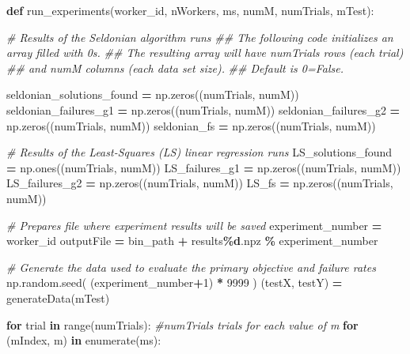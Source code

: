 \documentclass[12pt, twoside]{amherstthesis}
\newenvironment{Shaded}{\begin{snugshade}}{\end{snugshade}}
\newcommand{\BuiltInTok}[1]{#1}
\newcommand{\CommentTok}[1]{\textcolor[rgb]{0.56,0.35,0.01}{\textit{#1}}}
\newcommand{\ControlFlowTok}[1]{\textcolor[rgb]{0.13,0.29,0.53}{\textbf{#1}}}
\newcommand{\DecValTok}[1]{\textcolor[rgb]{0.00,0.00,0.81}{#1}}
\newcommand{\KeywordTok}[1]{\textcolor[rgb]{0.13,0.29,0.53}{\textbf{#1}}}
\newcommand{\NormalTok}[1]{#1}
\newcommand{\OperatorTok}[1]{\textcolor[rgb]{0.81,0.36,0.00}{\textbf{#1}}}
\newcommand{\SpecialCharTok}[1]{\textcolor[rgb]{0.81,0.36,0.00}{\textbf{#1}}}
\newcommand{\StringTok}[1]{\textcolor[rgb]{0.31,0.60,0.02}{#1}}
\begin{document}
\begin{Shaded}
\begin{Highlighting}[]
\KeywordTok{def}\NormalTok{ run\_experiments(worker\_id, nWorkers, ms, numM, numTrials, mTest):}
    
    \CommentTok{\# Results of the Seldonian algorithm runs}
    \CommentTok{\#\# The following code initializes an array filled with 0\textquotesingle{}s. }
    \CommentTok{\#\# The resulting array will have numTrials rows (each trial) }
    \CommentTok{\#\# and numM columns (each data set size).}
    \CommentTok{\#\# Default is 0=False.}
    
\NormalTok{    seldonian\_solutions\_found }\OperatorTok{=}\NormalTok{ np.zeros((numTrials, numM)) }
\NormalTok{    seldonian\_failures\_g1     }\OperatorTok{=}\NormalTok{ np.zeros((numTrials, numM)) }
\NormalTok{    seldonian\_failures\_g2     }\OperatorTok{=}\NormalTok{ np.zeros((numTrials, numM)) }
\NormalTok{    seldonian\_fs              }\OperatorTok{=}\NormalTok{ np.zeros((numTrials, numM)) }
    
    \CommentTok{\# Results of the Least{-}Squares (LS) linear regression runs}
\NormalTok{    LS\_solutions\_found }\OperatorTok{=}\NormalTok{ np.ones((numTrials, numM))  }
\NormalTok{    LS\_failures\_g1     }\OperatorTok{=}\NormalTok{ np.zeros((numTrials, numM)) }
\NormalTok{    LS\_failures\_g2     }\OperatorTok{=}\NormalTok{ np.zeros((numTrials, numM)) }
\NormalTok{    LS\_fs              }\OperatorTok{=}\NormalTok{ np.zeros((numTrials, numM)) }
    
    
    \CommentTok{\# Prepares file where experiment results will be saved}
\NormalTok{    experiment\_number }\OperatorTok{=}\NormalTok{ worker\_id}
\NormalTok{    outputFile }\OperatorTok{=}\NormalTok{ bin\_path }\OperatorTok{+} \StringTok{\textquotesingle{}results}\SpecialCharTok{\%d}\StringTok{.npz\textquotesingle{}} \OperatorTok{\%}\NormalTok{ experiment\_number}
    
    
    \CommentTok{\# Generate the data used to evaluate the primary objective and failure rates}
\NormalTok{    np.random.seed( (experiment\_number}\OperatorTok{+}\DecValTok{1}\NormalTok{) }\OperatorTok{*} \DecValTok{9999}\NormalTok{ )}
\NormalTok{    (testX, testY) }\OperatorTok{=}\NormalTok{ generateData(mTest) }
    
    
    \ControlFlowTok{for}\NormalTok{ trial }\KeywordTok{in} \BuiltInTok{range}\NormalTok{(numTrials): }\CommentTok{\#numTrials trials for each value of m }
        \ControlFlowTok{for}\NormalTok{ (mIndex, m) }\KeywordTok{in} \BuiltInTok{enumerate}\NormalTok{(ms): }
          

\end{Highlighting}
\end{Shaded}
\end{document}
